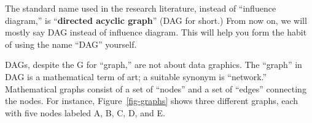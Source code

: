 \documentclass[
  letterpaper,
  DIV=11,
  numbers=noendperiod,
  oneside]{scrartcl}
\begin{document}
\begin{tcolorbox}[enhanced jigsaw, colbacktitle=quarto-callout-note-color!10!white, opacityback=0, breakable, opacitybacktitle=0.6, colback=white, coltitle=black, arc=.35mm, title=\textcolor{quarto-callout-note-color}{\faInfo}\hspace{0.5em}{Directed Acyclic Graphs}, left=2mm, colframe=quarto-callout-note-color-frame, rightrule=.15mm, bottomrule=.15mm, leftrule=.75mm, bottomtitle=1mm, toptitle=1mm, titlerule=0mm, toprule=.15mm]

The standard name used in the research literature, instead of
``influence diagram,'' is ``\textbf{directed acyclic graph}'' (DAG for
short.) From now on, we will mostly say DAG instead of influence
diagram. This will help you form the habit of using the name ``DAG''
yourself.

DAGs, despite the G for ``graph,'' are not about data graphics. The
``graph'' in DAG is a mathematical term of art; a suitable synonym is
``network.'' Mathematical graphs consist of a set of ``nodes'' and a set
of ``edges'' connecting the nodes. For instance, Figure~\ref{fig-graphs}
shows three different graphs, each with five nodes labeled A, B, C, D,
and E.

\begin{figure}[H]

\begin{minipage}{0.33\linewidth}



\end{minipage}%
%
\begin{minipage}{0.33\linewidth}

\centering{

}
\end{minipage}
\end{figure}
\end{tcolorbox}
\end{document}
